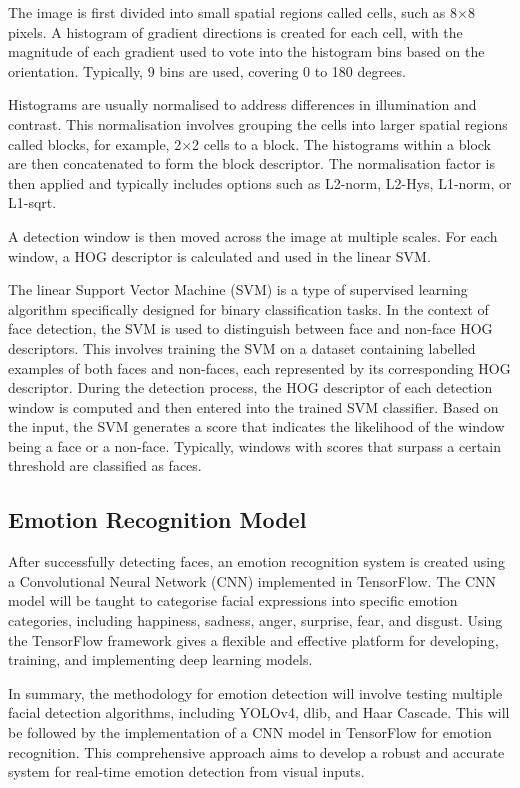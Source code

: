 The image is first divided into small spatial regions called cells, such as 8\(\times\)8 pixels. A histogram of gradient directions is created for each cell, with the magnitude of each gradient used to vote into the histogram bins based on the orientation. Typically, 9 bins are used, covering 0 to 180 degrees.

Histograms are usually normalised to address differences in illumination and contrast. This normalisation involves grouping the cells into larger spatial regions called blocks, for example, 2\(\times\)2 cells to a block. The histograms within a block are then concatenated to form the block descriptor. The normalisation factor is then applied and typically includes options such as L2-norm, L2-Hys, L1-norm, or L1-sqrt.

A detection window is then moved across the image at multiple scales. For each window, a HOG descriptor is calculated and used in the linear SVM.

The linear Support Vector Machine (SVM) is a type of supervised learning algorithm specifically designed for binary classification tasks. In the context of face detection, the SVM is used to distinguish between face and non-face HOG descriptors. This involves training the SVM on a dataset containing labelled examples of both faces and non-faces, each represented by its corresponding HOG descriptor. During the detection process, the HOG descriptor of each detection window is computed and then entered into the trained SVM classifier. Based on the input, the SVM generates a score that indicates the likelihood of the window being a face or a non-face. Typically, windows with scores that surpass a certain threshold are classified as faces. \cite{1467360}

\subsection{Emotion Recognition Model}

After successfully detecting faces, an emotion recognition system is created using a Convolutional Neural Network (CNN) implemented in TensorFlow. The CNN model will be taught to categorise facial expressions into specific emotion categories, including happiness, sadness, anger, surprise, fear, and disgust. Using the TensorFlow framework gives a flexible and effective platform for developing, training, and implementing deep learning models.

In summary, the methodology for emotion detection will involve testing multiple facial detection algorithms, including YOLOv4, dlib, and Haar Cascade. This will be followed by the implementation of a CNN model in TensorFlow for emotion recognition. This comprehensive approach aims to develop a robust and accurate system for real-time emotion detection from visual inputs.

